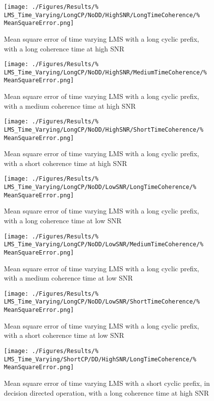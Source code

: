 \begin{figure}[ht]
	\texttt{[image: ./Figures/Results/\%
LMS\_Time\_Varying/LongCP/NoDD/HighSNR/LongTimeCoherence/\%
MeanSquareError.png]}
	\caption{Mean square error of time varying LMS with a 
	long cyclic prefix, with a long coherence time at high SNR}
\end{figure}
\begin{figure}[ht]
	\texttt{[image: ./Figures/Results/\%
LMS\_Time\_Varying/LongCP/NoDD/HighSNR/MediumTimeCoherence/\%
MeanSquareError.png]}
	\caption{Mean square error of time varying LMS with a 
	long cyclic prefix, with a medium coherence time at high SNR}
\end{figure}
\begin{figure}[ht]
	\texttt{[image: ./Figures/Results/\%
LMS\_Time\_Varying/LongCP/NoDD/HighSNR/ShortTimeCoherence/\%
MeanSquareError.png]}
	\caption{Mean square error of time varying LMS with a 
	long cyclic prefix, with a short coherence time at high SNR}
	\label{fig:LMS-Short-High-None}
\end{figure}
\begin{figure}[ht]
	\texttt{[image: ./Figures/Results/\%
LMS\_Time\_Varying/LongCP/NoDD/LowSNR/LongTimeCoherence/\%
MeanSquareError.png]}
	\caption{Mean square error of time varying LMS with a 
	long cyclic prefix, with a long coherence time at low SNR}
\end{figure}
\begin{figure}[ht]
	\texttt{[image: ./Figures/Results/\%
LMS\_Time\_Varying/LongCP/NoDD/LowSNR/MediumTimeCoherence/\%
MeanSquareError.png]}
	\caption{Mean square error of time varying LMS with a 
	long cyclic prefix, with a medium coherence time at low SNR}
\end{figure}
\begin{figure}[ht]
	\texttt{[image: ./Figures/Results/\%
LMS\_Time\_Varying/LongCP/NoDD/LowSNR/ShortTimeCoherence/\%
MeanSquareError.png]}
	\caption{Mean square error of time varying LMS with a 
	long cyclic prefix, with a short coherence time at low SNR}
\end{figure}
\begin{figure}[ht]
	\texttt{[image: ./Figures/Results/\%
LMS\_Time\_Varying/ShortCP/DD/HighSNR/LongTimeCoherence/\%
MeanSquareError.png]}
	\caption{Mean square error of time varying LMS with a 
	short cyclic prefix, in decision directed operation, 
	with a long coherence time at high SNR}
\end{figure}
